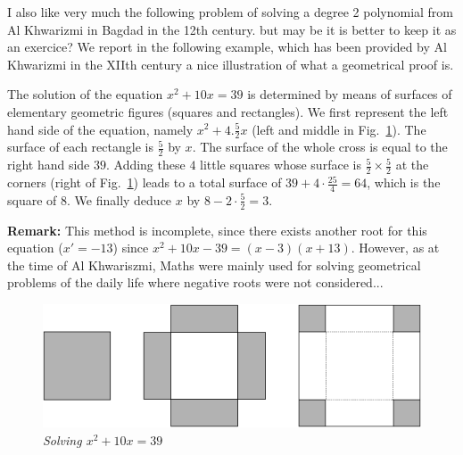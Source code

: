 {\Denis I also like very much the following problem of solving a degree 2 polynomial from Al Khwarizmi in Bagdad in the 12th century.
but may be it is better to keep it as an exercice?}
We report in the following example, which has been provided by Al Khwarizmi in the XIIth century a nice illustration of what a geometrical proof is. 
\bigskip

The solution of the equation $x^2 + 10 x = 39$ is determined by means of surfaces of elementary geometric figures (squares and rectangles). 
We first represent the left hand side of the equation, namely $x^2 + 4. \frac{5}{2} x$ (left and middle in Fig.~\ref{fig:EquationAlKawarizmi}). 
The surface of each rectangle is $\frac{5}{2}$ by $x$. 
The surface of the whole cross is equal to the right hand side $39$. 
Adding these $4$ little squares whose surface is $\frac{5}{2} \times \frac{5}{2}$ at the corners (right of Fig.~\ref{fig:EquationAlKawarizmi}) leads to a total surface of $39+4 \cdot \frac{25}{4} = 64$, which is the square of $8$.
We finally deduce $x$ by $8-2 \cdot \frac{5}{2} = 3$.

\textbf{Remark:}
This method is incomplete, since there exists another root for this equation ($x'=-13$) since $x^2 + 10x - 39 = (x-3)(x+13)$. 
However, as at the time of Al Khwariszmi, Maths were mainly used for solving geometrical problems of the daily life where
negative roots were not considered...

\begin{figure}[htb]
\begin{center}
       \includegraphics[scale=0.4]{FiguresArithmetic/EquationElKwarismi}
\caption{{\it Solving $x^2 + 10x = 39$}}
\label{fig:EquationAlKawarizmi}
\end{center}
\end{figure}

